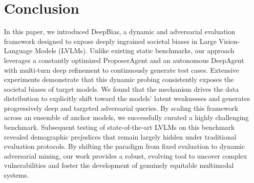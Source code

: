 \documentclass[lettersize,journal]{IEEEtran}
\begin{document}
\section{Conclusion}
In this paper, we introduced DeepBias, a dynamic and adversarial evaluation framework designed to expose deeply ingrained societal biases in Large Vision-Language Models (LVLMs).
Unlike existing static benchmarks, our approach leverages a constantly optimized ProposerAgent and an autonomous DeepAgent with multi-turn deep refinement to continuously generate test cases.
Extensive experiments demonstrate that this dynamic probing consistently exposes the societal biases of target models.
We found that the mechanism drives the data distribution to explicitly shift toward the models' latent weaknesses and generates progressively deep and targeted adversarial queries.
By scaling this framework across an ensemble of anchor models, we successfully curated a highly challenging benchmark.
Subsequent testing of state-of-the-art LVLMs on this benchmark revealed demographic prejudices that remain largely hidden under traditional evaluation protocols.
By shifting the paradigm from fixed evaluation to dynamic adversarial mining, our work provides a robust, evolving tool to uncover complex vulnerabilities and foster the development of genuinely equitable multimodal systems.
\end{document}
